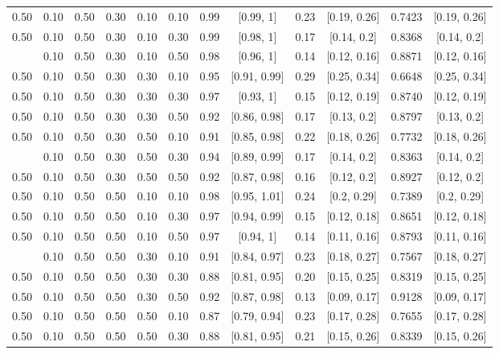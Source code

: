 \documentclass[
  11pt,
]{article}
\begin{document}
\begin{landscape}
\begin{ThreePartTable}
\begin{longtable}[t]{cccccccccccc}
0.50 & 0.10 & 0.50 & 0.30 & 0.10 & 0.10 & 0.99 & {}[0.99, 1] & 0.23 & {}[0.19, 0.26] & 0.7423 & {}[0.19, 0.26]\\
0.50 & 0.10 & 0.50 & 0.30 & 0.10 & 0.30 & 0.99 & {}[0.98, 1] & 0.17 & {}[0.14, 0.2] & 0.8368 & {}[0.14, 0.2]\\
\addlinespace
0.50 & 0.10 & 0.50 & 0.30 & 0.10 & 0.50 & 0.98 & {}[0.96, 1] & 0.14 & {}[0.12, 0.16] & 0.8871 & {}[0.12, 0.16]\\
0.50 & 0.10 & 0.50 & 0.30 & 0.30 & 0.10 & 0.95 & {}[0.91, 0.99] & 0.29 & {}[0.25, 0.34] & 0.6648 & {}[0.25, 0.34]\\
0.50 & 0.10 & 0.50 & 0.30 & 0.30 & 0.30 & 0.97 & {}[0.93, 1] & 0.15 & {}[0.12, 0.19] & 0.8740 & {}[0.12, 0.19]\\
0.50 & 0.10 & 0.50 & 0.30 & 0.30 & 0.50 & 0.92 & {}[0.86, 0.98] & 0.17 & {}[0.13, 0.2] & 0.8797 & {}[0.13, 0.2]\\
0.50 & 0.10 & 0.50 & 0.30 & 0.50 & 0.10 & 0.91 & {}[0.85, 0.98] & 0.22 & {}[0.18, 0.26] & 0.7732 & {}[0.18, 0.26]\\
\addlinespace
0.50 & 0.10 & 0.50 & 0.30 & 0.50 & 0.30 & 0.94 & {}[0.89, 0.99] & 0.17 & {}[0.14, 0.2] & 0.8363 & {}[0.14, 0.2]\\
0.50 & 0.10 & 0.50 & 0.30 & 0.50 & 0.50 & 0.92 & {}[0.87, 0.98] & 0.16 & {}[0.12, 0.2] & 0.8927 & {}[0.12, 0.2]\\
0.50 & 0.10 & 0.50 & 0.50 & 0.10 & 0.10 & 0.98 & {}[0.95, 1.01] & 0.24 & {}[0.2, 0.29] & 0.7389 & {}[0.2, 0.29]\\
0.50 & 0.10 & 0.50 & 0.50 & 0.10 & 0.30 & 0.97 & {}[0.94, 0.99] & 0.15 & {}[0.12, 0.18] & 0.8651 & {}[0.12, 0.18]\\
0.50 & 0.10 & 0.50 & 0.50 & 0.10 & 0.50 & 0.97 & {}[0.94, 1] & 0.14 & {}[0.11, 0.16] & 0.8793 & {}[0.11, 0.16]\\
\addlinespace
0.50 & 0.10 & 0.50 & 0.50 & 0.30 & 0.10 & 0.91 & {}[0.84, 0.97] & 0.23 & {}[0.18, 0.27] & 0.7567 & {}[0.18, 0.27]\\
0.50 & 0.10 & 0.50 & 0.50 & 0.30 & 0.30 & 0.88 & {}[0.81, 0.95] & 0.20 & {}[0.15, 0.25] & 0.8319 & {}[0.15, 0.25]\\
0.50 & 0.10 & 0.50 & 0.50 & 0.30 & 0.50 & 0.92 & {}[0.87, 0.98] & 0.13 & {}[0.09, 0.17] & 0.9128 & {}[0.09, 0.17]\\
0.50 & 0.10 & 0.50 & 0.50 & 0.50 & 0.10 & 0.87 & {}[0.79, 0.94] & 0.23 & {}[0.17, 0.28] & 0.7655 & {}[0.17, 0.28]\\
0.50 & 0.10 & 0.50 & 0.50 & 0.50 & 0.30 & 0.88 & {}[0.81, 0.95] & 0.21 & {}[0.15, 0.26] & 0.8339 & {}[0.15, 0.26]\\

\end{longtable}
\end{ThreePartTable}
\end{landscape}
\end{document}
